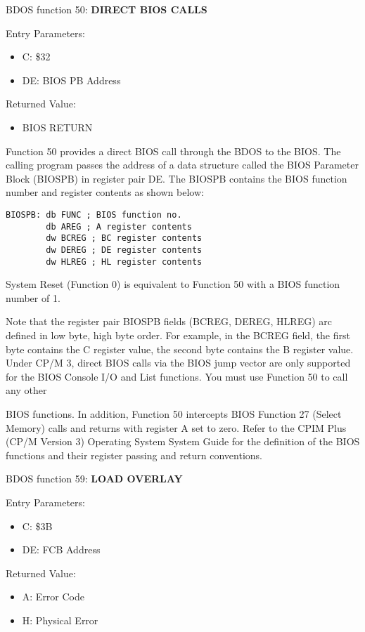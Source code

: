 BDOS function 50: \textbf{DIRECT BIOS CALLS}

Entry Parameters:
\begin{itemize}
\item[] C: \$32
\item[] DE: BIOS PB Address
\end{itemize}

Returned Value:
\begin{itemize}
\item[] BIOS RETURN
\end{itemize}

Function 50 provides a direct BIOS call through the BDOS to the
BIOS. The calling program passes the address of a data structure
called the BIOS Parameter Block (BIOSPB) in register pair DE. The
BIOSPB contains the BIOS function number and register contents as
shown below:

\begin{verbatim}
BIOSPB: db FUNC ; BIOS function no.
        db AREG ; A register contents
        dw BCREG ; BC register contents
        dw DEREG ; DE register contents
        dw HLREG ; HL register contents
\end{verbatim}

System Reset (Function 0) is equivalent to Function 50 with a BIOS
function number of 1.

Note that the register pair BIOSPB fields (BCREG, DEREG, HLREG) arc
defined in low byte, high byte order. For example, in the BCREG field,
the first byte contains the C register value, the second byte contains
the B register value.  Under CP/M 3, direct BIOS calls via the BIOS
jump vector are only supported for the BIOS Console I/O and List
functions. You must use Function 50 to call any other

BIOS functions. In addition, Function 50 intercepts BIOS Function 27
(Select Memory) calls and returns with register A set to zero. Refer
to the CPIM Plus (CP/M Version 3) Operating System System Guide for
the definition of the BIOS functions and their register passing and
return conventions.

BDOS function 59: \textbf{LOAD OVERLAY}

Entry Parameters:
\begin{itemize}
\item[] C: \$3B
\item[] DE: FCB Address
\end{itemize}

Returned Value:
\begin{itemize}
\item[] A: Error Code
\item[] H: Physical Error
\end{itemize}

